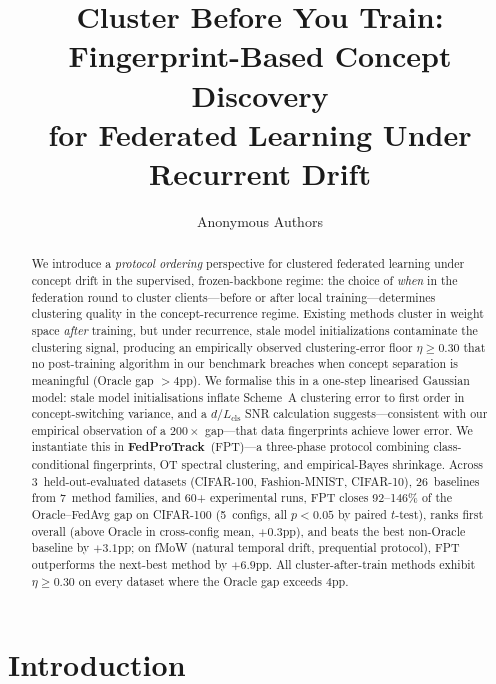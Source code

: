 \documentclass[11pt]{article}
\title{Cluster Before You Train: Fingerprint-Based Concept Discovery\\for Federated Learning Under Recurrent Drift}
\author{Anonymous Authors}
\begin{document}
\maketitle

\begin{abstract}
We introduce a \emph{protocol ordering} perspective for clustered federated learning under concept drift in the supervised, frozen-backbone regime: the choice of \emph{when} in the federation round to cluster clients---before or after local training---determines clustering quality in the concept-recurrence regime.
Existing methods cluster in weight space \emph{after} training, but under recurrence, stale model initializations contaminate the clustering signal, producing an empirically observed clustering-error floor $\eta \ge 0.30$ that no post-training algorithm in our benchmark breaches when concept separation is meaningful (Oracle gap $> 4$pp).
We formalise this in a one-step linearised Gaussian model: stale model initialisations inflate Scheme~A clustering error to first order in concept-switching variance, and a $d/L_{\mathrm{cls}}$ SNR calculation suggests---consistent with our empirical observation of a $200\times$ gap---that data fingerprints achieve lower error.
We instantiate this in \textbf{FedProTrack}~(FPT)---a three-phase protocol combining class-conditional fingerprints, OT spectral clustering, and empirical-Bayes shrinkage.
Across 3~held-out-evaluated datasets (CIFAR-100, Fashion-MNIST, CIFAR-10), 26~baselines from 7~method families, and 60+ experimental runs, FPT closes 92--146\% of the Oracle--FedAvg gap on CIFAR-100 (5~configs, all $p<0.05$ by paired $t$-test), ranks first overall (above Oracle in cross-config mean, $+0.3$pp), and beats the best non-Oracle baseline by $+3.1$pp; on fMoW (natural temporal drift, prequential protocol), FPT outperforms the next-best method by $+6.9$pp.
All cluster-after-train methods exhibit $\eta \ge 0.30$ on every dataset where the Oracle gap exceeds 4pp.
\end{abstract}

\section{Introduction}
\label{sec:intro}
\end{document}
